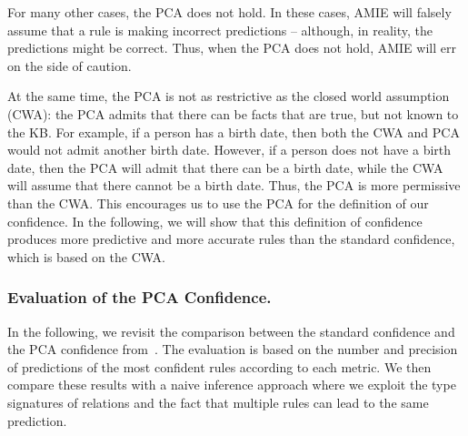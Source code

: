 For many other cases, the PCA does not hold. In these cases, AMIE will falsely assume that a rule is making incorrect predictions -- although, in reality,
the predictions might be correct.
Thus, when the PCA does not hold, AMIE will err on the side of caution.

At the same time, the PCA is not as restrictive as the closed world assumption (CWA):
the PCA admits that there can be facts that are true, but not known to the KB.
For example, if a person has a birth date, then both the CWA and PCA would not admit another birth date. However, if a person does not have a birth date, then the PCA will admit that there can be a birth date, while the CWA will assume that there cannot be a birth date. Thus, the PCA is more permissive than the CWA.
This encourages us to use the PCA for the definition of our confidence. In the following, we will show that this definition of confidence produces
 more predictive and more accurate rules than the standard confidence, which is based on the CWA.

\subsubsection{Evaluation of the PCA Confidence.}
\label{subsubsec:std_vs_pca}
In the following, we revisit the comparison between the standard confidence 
and the PCA confidence from~\cite{amie}.
The evaluation is based on the number and precision of predictions of the most confident rules according to each metric.
We then compare these results with a naive inference approach where we exploit the type signatures of 
relations and the fact that multiple rules can lead to the same prediction. 



